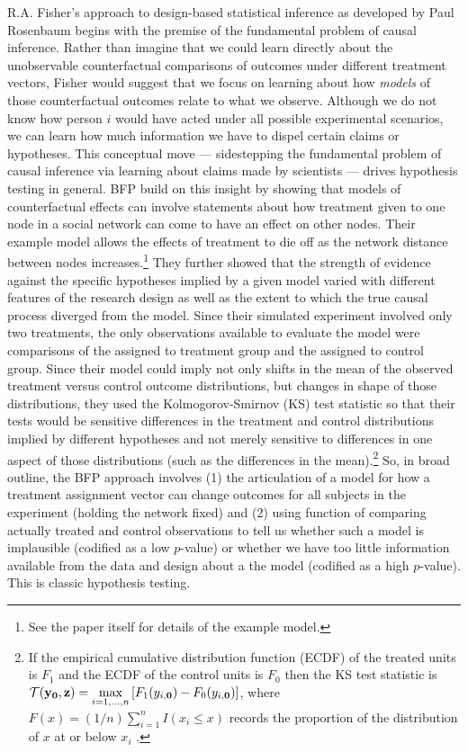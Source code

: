 R.A. Fisher's approach to design-based statistical inference  \citep[Chap
2]{fisher:1935} as developed by Paul Rosenbaum  \citep{rosenbaum2010design}
begins with the premise of the fundamental problem of causal inference. Rather
than imagine that we could learn directly about the unobservable
counterfactual comparisons of outcomes under different treatment vectors,
Fisher would suggest that we focus on learning about how \emph{models} of
those counterfactual outcomes relate to what we observe. Although we do not
know how person $i$ would have acted under all possible experimental
scenarios, we can learn how much information we have to dispel certain claims
or hypotheses.  This conceptual move --- sidestepping the fundamental problem
of causal inference via learning about claims made by scientists --- drives
hypothesis testing in general.  BFP build on this insight by showing that
models of counterfactual effects can involve statements about how treatment
given to one node in a social network can come to have an effect on other
nodes. Their example model allows the effects of treatment to die off as the
network distance between nodes increases.\footnote{See the paper itself for
  details of the example model.} They further showed that the strength of
evidence against the specific hypotheses implied by a given model varied with
different features of the research design as well as the extent to which the
true causal process diverged from the model. Since their simulated experiment
involved only two treatments, the only observations available to evaluate the
model were comparisons of the assigned to treatment group and the assigned to
control group. Since their model could imply not only shifts in the mean of
the observed treatment versus control outcome distributions, but changes in
shape of those distributions, they used the Kolmogorov-Smirnov (KS) test
statistic so that their tests would be sensitive differences in the treatment
and control distributions implied by different hypotheses and not merely
sensitive to differences in one aspect of those distributions (such as the
differences in the mean).\footnote{If the empirical cumulative distribution
  function (ECDF) of the treated units is $F_1$ and the ECDF of the control
  units is $F_0$ then the KS test statistic is $\mathcal{T}(\mathbf{y}_{\mathbf{0}},\mathbf{z}) = \underset{i =
    1,\ldots,n}{\text{max}}\left[F_1(y_{i,\mathbf{0}}) -
    F_0(y_{i,\mathbf{0}})\right]$, where $F(x)=(1/n)\sum_{i=1}^n I(x_i \le x)$
  records the proportion of the distribution of $x$ at or below $x_i$
  \citep[\S 5.4]{MylesHollander1999a}.} So, in broad outline, the BFP approach
involves (1) the articulation of a model for how a treatment assignment vector
can change outcomes for all subjects in the experiment (holding the network
fixed) and (2) using function of comparing actually treated and control
observations to tell us whether such a model is implausible (codified as a low
$p$-value)  or whether we have too little information available from the data
and design about a the model (codified as a high $p$-value). This is classic
hypothesis testing.

